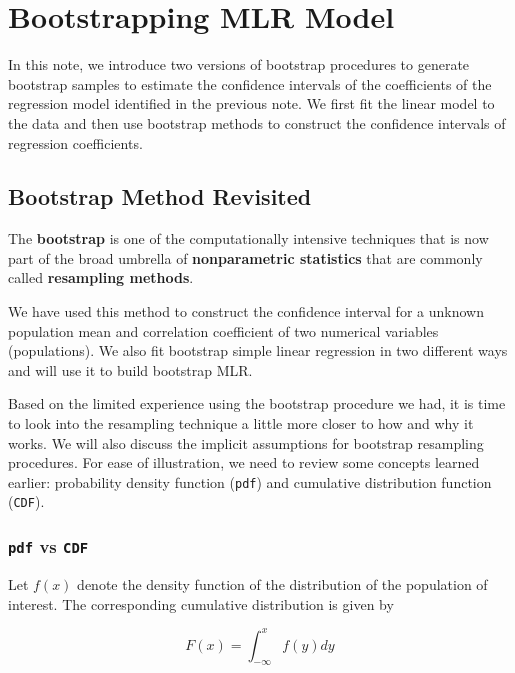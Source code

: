 \documentclass[
]{book}
\begin{document}
\hypertarget{bootstrapping-mlr-model}{%
\chapter{Bootstrapping MLR Model}\label{bootstrapping-mlr-model}}

In this note, we introduce two versions of bootstrap procedures to generate bootstrap samples to estimate the confidence intervals of the coefficients of the regression model identified in the previous note. We first fit the linear model to the data and then use bootstrap methods to construct the confidence intervals of regression coefficients.

\hypertarget{bootstrap-method-revisited}{%
\section{Bootstrap Method Revisited}\label{bootstrap-method-revisited}}

The \textbf{bootstrap} is one of the computationally intensive techniques that is now part of the broad umbrella of \textbf{nonparametric statistics} that are commonly called \textbf{resampling methods}.

We have used this method to construct the confidence interval for a unknown population mean and correlation coefficient of two numerical variables (populations). We also fit bootstrap simple linear regression in two different ways and will use it to build bootstrap MLR.

Based on the limited experience using the bootstrap procedure we had, it is time to look into the resampling technique a little more closer to how and why it works. We will also discuss the implicit assumptions for bootstrap resampling procedures. For ease of illustration, we need to review some concepts learned earlier: probability density function (\texttt{pdf}) and cumulative distribution function (\texttt{CDF}).

\hypertarget{pdf-vs-cdf}{%
\subsection{\texorpdfstring{\texttt{pdf} vs \texttt{CDF}}{pdf vs CDF}}\label{pdf-vs-cdf}}

Let \(f(x)\) denote the density function of the distribution of the population of interest. The corresponding cumulative distribution is given by

\[
F(x) = \int_{-\infty}^x f(y)dy
\]
\end{document}
